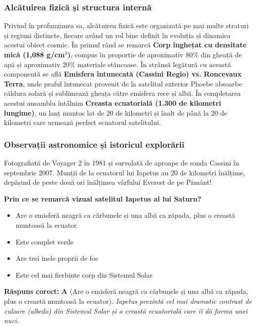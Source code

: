 \subsubsection*{Alcătuirea fizică și structura internă}
Privind în profunzimea sa, alcătuirea fizică este organizată pe mai multe straturi și regiuni distincte, fiecare având un rol bine definit în evoluția și dinamica acestui obiect cosmic. În primul rând se remarcă \textbf{Corp înghețat cu densitate mică (1,088 g/cm$^3$)}, compus în proporție de aproximativ 80\% din gheață de apă și aproximativ 20\% materiale stâncoase. În strânsă legătură cu această componentă se află \textbf{Emisfera întunecată (Cassini Regio) vs. Roncevaux Terra}, unde praful întunecat provenit de la satelitul exterior Phoebe absoarbe căldura solară și sublimează gheața către emisfera rece și albă. În completarea acestui ansamblu întâlnim \textbf{Creasta ecuatorială (1.300 de kilometri lungime)}, un lanț muntos lat de 20 de kilometri și înalt de până la 20 de kilometri care urmează perfect ecuatorul satelitului.

\subsubsection*{Observații astronomice și istoricul explorării}
Fotografiată de Voyager 2 în 1981 și survolată de aproape de sonda Cassini în septembrie 2007. Munții de la ecuatorul lui Iapetus au 20 de kilometri înălțime, depășind de peste două ori înălțimea vârfului Everest de pe Pământ!

\vspace{6pt}
\begin{tcolorbox}[orbitarquiz, title={\textbf{Întrebare de verificare \#22: Iapetus}}]
\textbf{Prin ce se remarcă vizual satelitul Iapetus al lui Saturn?}
\begin{itemize}[leftmargin=2.2em, itemsep=2pt, topsep=4pt]
  \item[$\square$ \textbf{A.}] Are o emisferă neagră ca cărbunele și una albă ca zăpada, plus o creastă muntoasă la ecuator
  \item[$\square$ \textbf{B.}] Este complet verde
  \item[$\square$ \textbf{C.}] Are trei inele proprii de foc
  \item[$\square$ \textbf{D.}] Este cel mai fierbinte corp din Sistemul Solar
\end{itemize}
\vspace{2pt}
{\footnotesize\color{orbitarMuted}\textbf{Răspuns corect:} \textbf{A} (Are o emisferă neagră ca cărbunele și una albă ca zăpada, plus o creastă muntoasă la ecuator). \emph{Iapetus prezintă cel mai dramatic contrast de culoare (albedo) din Sistemul Solar și o creastă ecuatorială care îi dă forma unei nuci.}}
\end{tcolorbox}
\clearpage


